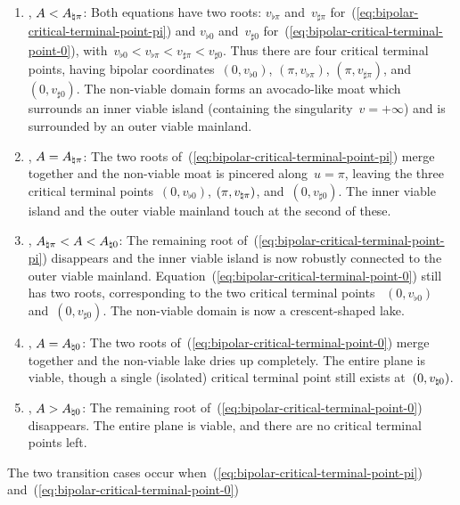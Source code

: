 \begin{enumerate}
  \item
    , $A < A_{\natural \pi}$:
    Both equations have two roots:
    $v_{\flat \pi}$ and~$v_{\sharp \pi}$
    for~(\ref{eq:bipolar-critical-terminal-point-pi})
    and
    $v_{\flat 0}$ and~$v_{\sharp 0}$
    for~(\ref{eq:bipolar-critical-terminal-point-0}),
    with~$v_{\flat 0} < v_{\flat \pi} < v_{\sharp \pi} < v_{\sharp 0}$.
    Thus there are four critical terminal points,
    having bipolar coordinates~$(0, v_{\flat 0})$, $(\pi, v_{\flat \pi})$,
    $(\pi, v_{\sharp \pi})$, and~$(0, v_{\sharp 0})$.
    The non-viable domain forms an avocado-like moat
    which surrounds an inner viable island
    (containing the singularity~$v = +\infty$)
    and is surrounded by an outer viable mainland.
  \item
    , $A = A_{\natural \pi}$:
    The two roots of~(\ref{eq:bipolar-critical-terminal-point-pi})
    merge together
    and the non-viable moat is pincered along~$u = \pi$,
    leaving the three critical terminal points~$(0, v_{\flat 0})$,
    $(\pi, v_{\natural \pi})$, and~$(0, v_{\sharp 0})$.
    The inner viable island and the outer viable mainland
    touch at the second of these.
  \item
    , $A_{\natural \pi} < A < A_{\natural 0}$:
    The remaining root of~(\ref{eq:bipolar-critical-terminal-point-pi})
    disappears
    and the inner viable island is now robustly connected
    to the outer viable mainland.
    Equation~(\ref{eq:bipolar-critical-terminal-point-0}) still has two roots,
    corresponding to the two critical terminal points~%
      $(0, v_{\flat 0})$ and~$(0, v_{\sharp 0})$.
    The non-viable domain is now a crescent-shaped lake.
  \item
    , $A = A_{\natural 0}$:
    The two roots of~(\ref{eq:bipolar-critical-terminal-point-0})
    merge together
    and the non-viable lake dries up completely.
    The entire plane is viable,
    though a single (isolated) critical terminal point still exists
    at~$(0, v_{\natural 0})$.
  \item
    , $A > A_{\natural 0}$:
    The remaining root of~(\ref{eq:bipolar-critical-terminal-point-0})
    disappears.
    The entire plane is viable,
    and there are no critical terminal points left.
\end{enumerate}
The two transition cases occur
when~(\ref{eq:bipolar-critical-terminal-point-pi})
and~(\ref{eq:bipolar-critical-terminal-point-0})
